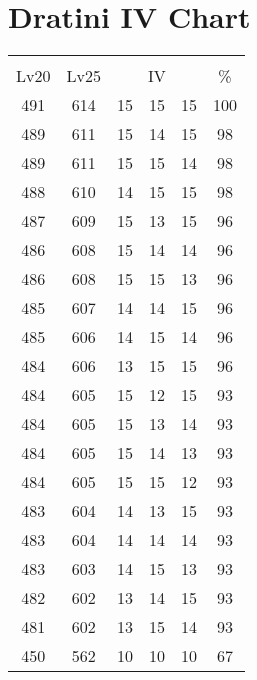 \documentclass{article}%
\begin{document}
%
\normalsize%
\section{Dratini IV Chart}%
\label{sec:Dratini IV Chart}%
\renewcommand{\arraystretch}{1.5}%
\begin{tabular}{|c|c|c|c|c|c|}%
\hline%
\multicolumn{6}{|c|}{\textcolor{white}{ 
\linebreak{Dratini}
}%
\cellcolor{black}}\\%
\multicolumn{1}{|c}{Lv20}&\multicolumn{1}{c|}{Lv25}&\multicolumn{3}{c|}{IV}&\multicolumn{1}{|c|}{\%}\\%
\hline%
\rowcolor{color100}%
491&614&15&15&15&100\\%
\hline%
\rowcolor{color98}%
489&611&15&14&15&98\\%
\hline%
\rowcolor{color98}%
489&611&15&15&14&98\\%
\hline%
\rowcolor{color98}%
488&610&14&15&15&98\\%
\hline%
\rowcolor{color96}%
487&609&15&13&15&96\\%
\hline%
\rowcolor{color96}%
486&608&15&14&14&96\\%
\hline%
\rowcolor{color96}%
486&608&15&15&13&96\\%
\hline%
\rowcolor{color96}%
485&607&14&14&15&96\\%
\hline%
\rowcolor{color96}%
485&606&14&15&14&96\\%
\hline%
\rowcolor{color96}%
484&606&13&15&15&96\\%
\hline%
\rowcolor{color93}%
484&605&15&12&15&93\\%
\hline%
\rowcolor{color93}%
484&605&15&13&14&93\\%
\hline%
\rowcolor{color93}%
484&605&15&14&13&93\\%
\hline%
\rowcolor{color93}%
484&605&15&15&12&93\\%
\hline%
\rowcolor{color93}%
483&604&14&13&15&93\\%
\hline%
\rowcolor{color93}%
483&604&14&14&14&93\\%
\hline%
\rowcolor{color93}%
483&603&14&15&13&93\\%
\hline%
\rowcolor{color93}%
482&602&13&14&15&93\\%
\hline%
\rowcolor{color93}%
481&602&13&15&14&93\\%
\hline%
\rowcolor{color91}%
450&562&10&10&10&67\\%
\end{tabular}

%
\end{document}
